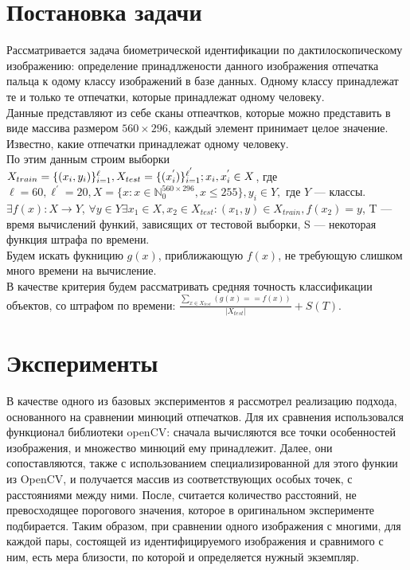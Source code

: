 \documentclass{article}
\begin{document}
\section{Постановка задачи}
Рассматривается задача биометрической идентификации по дактилоскопическому изображению: определение принадлжености данного изображения отпечатка пальца к одому классу изображений в базе данных. Одному классу принадлежат те и только те отпечатки, которые принадлежат одному человеку.\\

Данные представляют из себе сканы отпеачтков, которые можно представить в виде массива размером $560 \times 296$, каждый элемент принимает целое значение. Известно, какие отпечатки принадлежат одному человеку. \\


По этим данным строим выборки $X_{train} = \{(x_{i}, y_{i})\}_{i = 1}^{\ell}, \\ X_{test} = \{(x_{i}^{'})\}_{i = 1}^{\ell^{'}}; x_{i}, x_{i}^{'} \in X$, где $\ell = 60, \ell^{'} = 20,   X = \{x: x \in \mathbb{N}_{0}^{560 \times 296}, x \leq 255\}, y_{i} \in Y, $ где $Y$ — классы. $\exists f(x): X \to Y$, $\forall y \in Y \exists x_{1} \in X,  x_{2} \in X_{test}: (x_{1}, y) \in X_{train}, f(x_{2}) = y $,
T — время вычислений функий, зависящих от тестовой выборки, S — некоторая функция штрафа по времени. \\
Будем искать фукницию $g(x)$, приближающую $f(x)$, не требующую слишком много времени на вычисление. \\
В качестве критерия будем рассматривать средняя точность классификации объектов, со штрафом по времени: $\frac{\sum_{x \in {X_{test}}}(g(x) == f(x))}{|X_{test}|} + S(T)$.


\section{Эксперименты}
В качестве одного из базовых экспериментов я рассмотрел реализацию подхода, основанного на сравнении минюций отпечатков. Для их сравнения использовался функционал библиотеки openCV: сначала вычисляются все точки особенностей изображения, и множество минюций ему принадлежит. Далее, они сопоставляются, также с использованием специализированной для этого функии из OpenCV, и получается массив из соответствующих особых точек, с расстояниями между ними. После, считается количество расстояний, не превосходящее порогового значения, которое в оригинальном эксперименте подбирается. Таким образом, при сравнении одного изображения с многими, для каждой пары, состоящей из идентифицируемого изображения и сравнимого с ним, есть мера близости, по которой и определяется нужный экземпляр. 
\end{document}
